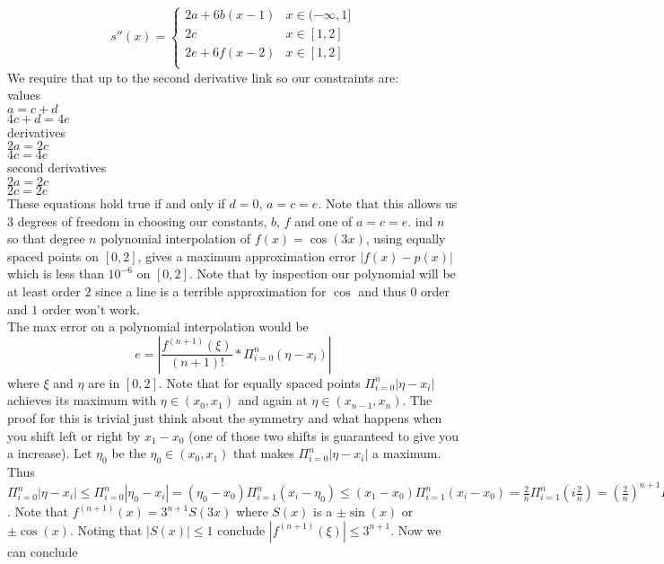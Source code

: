 \documentclass[12pt]{article}
\makeatletter
\theoremstyle{homework}
\newenvironment{exercise}[1]
{\def\@currentlabel{#1}\exercisecore}
{\endexercisecore}
\makeatother
\begin{document}
$$s''(x)=\begin{cases}
2a+6b(x-1) & x\in(-\infty,1]\\
2c & x\in[1,2]\\
2e+6f(x-2) & x\in[1,2]\\
\end{cases}$$
We require that up to the second derivative link so our constraints are:\\
values\\
$a=c+d$\\
$4c+d=4e$\\
derivatives\\
$2a=2c$\\
$4c=4e$\\
second derivatives\\
$2a=2c$\\
$2c=2e$\\
These equations hold true if and only if $d=0$, $a=c=e$.  Note that this allows us 3 degrees of freedom in choosing our constants, $b$, $f$ and one of $a=c=e$.
\begin{exercise}

Find $n$ so that degree $n$ polynomial interpolation of $f (x) = \cos(3x)$, using equally spaced
points on $[0, 2]$, gives a maximum approximation error $|f (x) - p(x)|$ which is
less than $10^{-6}$ on $[0, 2]$.
\end{exercise}
Note that by inspection our polynomial will be at least order $2$ since a line is a terrible approximation for $\cos$ and thus $0$ order and $1$ order won't work.\\
The max error on a polynomial interpolation would be
$$e=|\frac{f^{(n+1)}(\xi)}{(n+1)!}*\Pi_{i=0}^{n}(\eta-x_i)|$$
where $\xi$ and $\eta$ are in $[0,2]$.  Note that for equally spaced points $\Pi_{i=0}^{n}|\eta-x_i|$ achieves its maximum with $\eta\in(x_0,x_1)$ and again at $\eta\in(x_{n-1},x_n)$.  The proof for this is trivial just think about the symmetry and what happens when you shift left or right by $x_1-x_0$ (one of those two shifts is guaranteed to give you a increase).  Let $\eta_0$ be the $\eta_0\in(x_0,x_1)$ that makes $\Pi_{i=0}^{n}|\eta-x_i|$ a maximum.  Thus 
$\Pi_{i=0}^{n}|\eta-x_i|\leq
\Pi_{i=0}^{n}|\eta_0-x_i|=
(\eta_0-x_0)\Pi_{i=1}^{n}(x_i-\eta_0)\leq 
(x_1-x_0)\Pi_{i=1}^{n}(x_i-x_0)=
\frac{2}{n}\Pi_{i=1}^{n}(i\frac{2}{n})=
(\frac{2}{n})^{n+1}\Pi_{i=1}^{n}i=
(\frac{2}{n})^{n+1}n!$.  Note that $f^{(n+1)}(x)=3^{n+1}S(3x)$ where $S(x)$ is a $\pm\sin(x)$ or $\pm\cos(x)$.  Noting that $|S(x)|\leq 1$ conclude $|f^{(n+1)}(\xi)|\leq 3^{n+1}$.  Now we can conclude 
\end{document}
